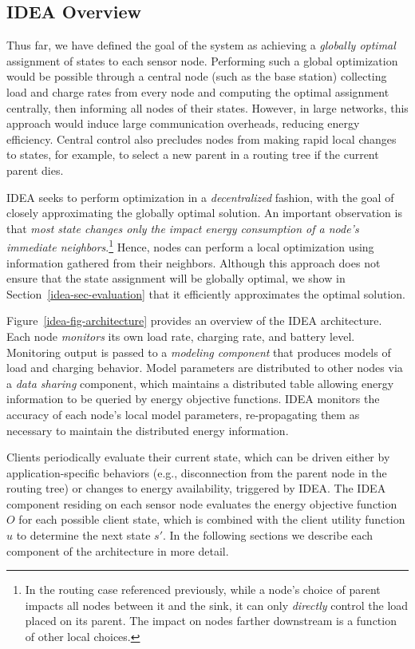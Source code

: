 \subsection{IDEA Overview}

Thus far, we have defined the goal of the system as achieving a
\textit{globally optimal} assignment of states to each sensor node.
Performing such a global optimization would be possible through a central
node (such as the base station) collecting load and charge rates from every
node and computing the optimal assignment centrally, then informing all nodes
of their states. However, in large networks, this approach would induce large
communication overheads, reducing energy efficiency. Central control also
precludes nodes from making rapid local changes to states, for example, to
select a new parent in a routing tree if the current parent dies.

IDEA seeks to perform optimization in a \textit{decentralized} fashion, with
the goal of closely approximating the globally optimal solution. An important
observation is that \textit{most state changes only the impact energy
consumption of a node's immediate neighbors}.\footnote{In the routing case
referenced previously, while a node's choice of parent impacts all nodes
between it and the sink, it can only \textit{directly} control the load
placed on its parent. The impact on nodes farther downstream is a function of
other local choices.} Hence, nodes can perform a local optimization using
information gathered from their neighbors. Although this approach does not
ensure that the state assignment will be globally optimal, we show in
Section~\ref{idea-sec-evaluation} that it efficiently approximates the
optimal solution.

Figure~\ref{idea-fig-architecture} provides an overview of the IDEA
architecture. Each node \textit{monitors} its own load rate, charging rate,
and battery level.  Monitoring output is passed to a \textit{modeling
component} that produces models of load and charging behavior. Model
parameters are distributed to other nodes via a \textit{data sharing}
component, which maintains a distributed table allowing energy information to
be queried by energy objective functions. IDEA monitors the accuracy of each
node's local model parameters, re-propagating them as necessary to maintain
the distributed energy information.

Clients periodically evaluate their current state, which can be driven either
by application-specific behaviors (e.g., disconnection from the parent node
in the routing tree) or changes to energy availability, triggered by IDEA.
The IDEA component residing on each sensor node evaluates the energy
objective function $O$ for each possible client state, which is combined with
the client utility function $u$ to determine the next state $s'$. In the
following sections we describe each component of the architecture in more
detail.

